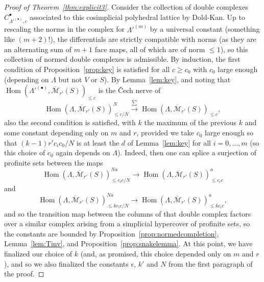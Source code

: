 \documentclass[11pt]{amsbook}
\DeclareMathOperator{\Hom}{Hom}
\numberwithin{equation}{section}
\numberwithin{theorem}{section}
\theoremstyle{definition}
\begin{document}
\begin{proof}[Proof of Theorem~\ref{thm:explicit3}]
Consider the collection of double complexes $C_{\Lambda'^{(\bullet)},c}^\bullet$ associated to this cosimplicial polyhedral lattice by Dold-Kan. Up to rescaling the norms in the complex for $\Lambda'^{(m)}$ by a universal constant (something like $(m+2)!$), the differentials are strictly compatible with norms (as they are an alternating sum of $m+1$ face maps, all of which are of norm $\leq 1$), so this collection of normed double complexes is admissible. By induction, the first condition of Proposition~\ref{prop:key} is satisfied for all $c\geq c_0$ with $c_0$ large enough (depending on $\Lambda$ but not $V$ or $S$). By Lemma~\ref{lem:key}, and noting that $\Hom(\Lambda'^{(\bullet)},\overline{\mathcal M}_{r'}(S))_{\leq c}$ is the \v{C}ech nerve of
\[
\Hom(\Lambda,\overline{\mathcal M}_{r'}(S))_{\leq c/N}^N\xrightarrow{\sum} \Hom(\Lambda,\overline{\mathcal M}_{r'}(S))_{\leq c},
\]
also the second condition is satisfied, with $k$ the maximum of the previous $k$ and some constant depending only on $m$ and $r$, provided we take $c_0$ large enough so that $(k-1)r'c_ic_0/N$ is at least the $d$ of Lemma~\ref{lem:key} for all $i=0,\ldots,m$ (so this choice of $c_0$ again depends on $\Lambda$). Indeed, then one can splice a surjection of profinite sets between the maps
\[
\Hom(\Lambda,\overline{\mathcal M}_{r'}(S))_{\leq c_ic/N}^{Na}\to\Hom(\Lambda,\overline{\mathcal M}_{r'}(S))_{\leq c_ic}^a
\]
and
\[
\Hom(\Lambda,\overline{\mathcal M}_{r'}(S))_{\leq kc_ic/N}^{Na}\to \Hom(\Lambda,\overline{\mathcal M}_{r'}(S))_{\leq kc_ic}^a,
\]
and so the transition map between the columns of that double complex factors over a similar complex arising from a simplicial hypercover of profinite sets, so the constants are bounded by Proposition~\ref{prop:normedcompletion}, Lemma~\ref{lem:Tinv}, and Proposition~\ref{prop:snakelemma}. At this point, we have finalized our choice of $k$ (and, as promised, this choice depended only on $m$ and $r$), and so we also finalized the constants $\epsilon$, $k'$ and $N$ from the first paragraph of the proof.


\end{proof}
\end{document}
